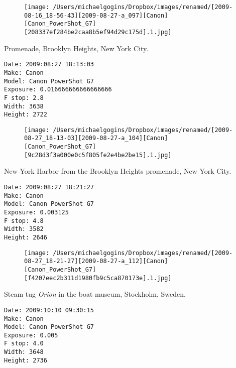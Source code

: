 \documentclass[11pt,letter,DIV=14,paper=landscape]{scrbook}
\begin{document}
\begin{figure}
\texttt{[image: /Users/michaelgogins/Dropbox/images/renamed/[2009-08-16\_18-56-43][2009-08-27-a\_097][Canon][Canon\_PowerShot\_G7][208337ef284be2caa8b5ef94d29c175d].1.jpg]}
\end{figure}
    
\clearpage
\noindent Promenade, Brooklyn Heights, New York City.
\noindent
\begin{lstlisting}
Date: 2009:08:27 18:13:03
Make: Canon
Model: Canon PowerShot G7
Exposure: 0.016666666666666666
F stop: 2.8
Width: 3638
Height: 2722
\end{lstlisting}
\clearpage

\begin{figure}
\texttt{[image: /Users/michaelgogins/Dropbox/images/renamed/[2009-08-27\_18-13-03][2009-08-27-a\_104][Canon][Canon\_PowerShot\_G7][9c28d3f3a000e0c5f805fe2e4be2be15].1.jpg]}
\end{figure}
    
\clearpage
\noindent New York Harbor from the Brooklyn Heights promenade, New York City.
\noindent
\begin{lstlisting}
Date: 2009:08:27 18:21:27
Make: Canon
Model: Canon PowerShot G7
Exposure: 0.003125
F stop: 4.8
Width: 3582
Height: 2646
\end{lstlisting}
\clearpage

\begin{figure}
\texttt{[image: /Users/michaelgogins/Dropbox/images/renamed/[2009-08-27\_18-21-27][2009-08-27-a\_112][Canon][Canon\_PowerShot\_G7][f4207eec2b311d1980fb9c5ca870173e].1.jpg]}
\end{figure}
    
\clearpage
\noindent Steam tug \emph{Orion} in the boat museum, Stockholm, Sweden.
\noindent
\begin{lstlisting}
Date: 2009:10:10 09:30:15
Make: Canon
Model: Canon PowerShot G7
Exposure: 0.005
F stop: 4.0
Width: 3648
Height: 2736
\end{lstlisting}
\clearpage
\end{document}

